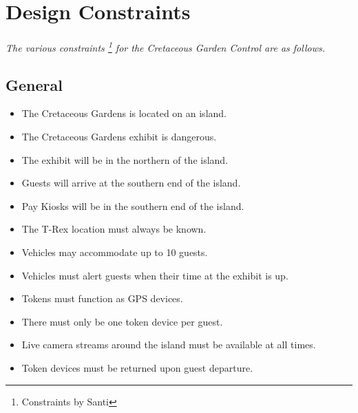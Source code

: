 \documentclass[12pt]{article}
\begin{document}
\section{Design Constraints}
\label{con}
\paragraph{} \textit{The various constraints \footnote{Constraints by Santi} for the Cretaceous Garden Control are as follows.}
    \subsection{General}
    \begin{itemize}
        \item The Cretaceous Gardens is located on an island.
        \item The Cretaceous Gardens exhibit is dangerous.
        \item The exhibit will be in the northern of the island.
        \item Guests will arrive at the southern end of the island.
        \item Pay Kiosks will be in the southern end of the island.
        \item The T-Rex location must always be known.
        \item Vehicles may accommodate up to 10 guests.
        \item Vehicles must alert guests when their time at the exhibit is up.
        \item Tokens must function as GPS devices.
        \item There must only be one token device per guest.
        \item Live camera streams around the island must be available at all times.
        \item Token devices must be returned upon guest departure.
    \end{itemize}
    
\end{document}
